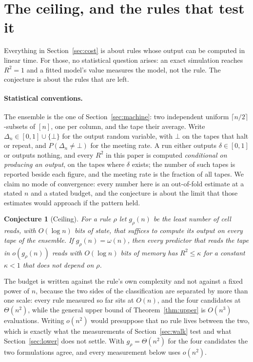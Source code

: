 \documentclass[11pt]{article}
\newtheorem{conjecture}{Conjecture}
\begin{document}
\section{The ceiling, and the rules that test it}\label{sec:ceiling}

Everything in Section~\ref{sec:cost} is about rules whose output can be computed in linear time. For
those, no statistical question arises: an exact simulation reaches $R^2=1$ and a fitted model's value
measures the model, not the rule. The conjecture is about the rules that are left.

\paragraph{Statistical conventions.} The ensemble is the one of Section~\ref{sec:machine}: two
independent uniform $\lceil n/2\rceil$-subsets of $[n]$, one per column, and the tape their average.
Write $\Delta_n\in[0,1]\cup\{\bot\}$ for the output random variable, with $\bot$ on the tapes that halt or repeat, and $P(\Delta_n\ne\bot)$ for the meeting rate. A run either outputs $\delta\in[0,1]$ or outputs nothing, and every $R^2$ in this paper is computed
\emph{conditional on producing an output}, on the tapes where $\delta$ exists; the number of such
tapes is reported beside each figure, and the meeting rate is the fraction of all tapes. We claim no
mode of convergence: every number here is an out-of-fold estimate at a stated $n$ and a stated
budget, and the conjecture is about the limit that those estimates would approach if the pattern held.

\begin{conjecture}[Ceiling]
For a rule $\rho$ let $g_\rho(n)$ be the least number of cell reads, with $O(\log n)$ bits of state,
that suffices to compute its output on every tape of the ensemble. If $g_\rho(n)=\omega(n)$, then every
predictor that reads the tape in $o(g_\rho(n))$ reads with $O(\log n)$ bits of memory has
$R^2\le\kappa$ for a constant $\kappa<1$ that does not depend on $\rho$.
\end{conjecture}

The budget is written against the rule's own complexity and not against a fixed power of $n$, because
the two sides of the classification are separated by more than one scale: every rule measured so far
sits at $O(n)$, and the four candidates at $\Theta(n^2)$, while the general upper bound of
Theorem~\ref{thm:upper} is $O(n^3)$ evaluations. Writing $o(n^2)$ would presuppose that no rule lives
between the two, which is exactly what the measurements of Section~\ref{sec:walk} test and what
Section~\ref{sec:lower} does not settle. With $g_\rho=\Theta(n^2)$ for the four candidates the two
formulations agree, and every measurement below uses $o(n^2)$.
\end{document}
